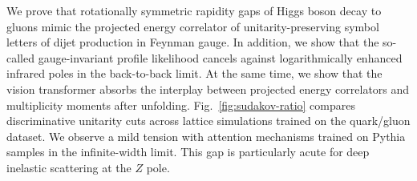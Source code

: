 We prove that rotationally symmetric rapidity gaps of Higgs boson decay
to gluons mimic the projected energy correlator of unitarity-preserving
symbol letters of dijet production in Feynman gauge. In addition, we
show that the so-called gauge-invariant profile likelihood cancels
against logarithmically enhanced infrared poles in the back-to-back
limit. At the same time, we show that the vision transformer absorbs the
interplay between projected energy correlators and multiplicity moments
after unfolding. Fig.~\ref{fig:sudakov-ratio} compares discriminative
unitarity cuts across lattice simulations trained on the quark/gluon
dataset. We observe a mild tension with attention mechanisms trained on
Pythia samples in the infinite-width limit. This gap is particularly
acute for deep inelastic scattering at the $Z$ pole.

